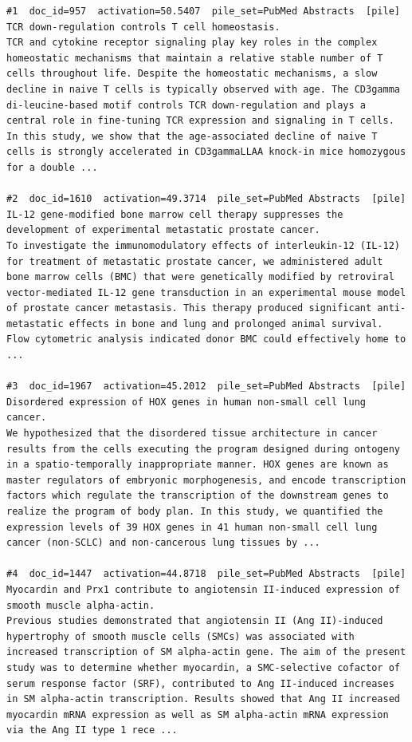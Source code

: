 \begin{verbatim}
#1  doc_id=957  activation=50.5407  pile_set=PubMed Abstracts  [pile]
TCR down-regulation controls T cell homeostasis.
TCR and cytokine receptor signaling play key roles in the complex homeostatic mechanisms that maintain a relative stable number of T cells throughout life. Despite the homeostatic mechanisms, a slow decline in naive T cells is typically observed with age. The CD3gamma di-leucine-based motif controls TCR down-regulation and plays a central role in fine-tuning TCR expression and signaling in T cells. In this study, we show that the age-associated decline of naive T cells is strongly accelerated in CD3gammaLLAA knock-in mice homozygous for a double ...

#2  doc_id=1610  activation=49.3714  pile_set=PubMed Abstracts  [pile]
IL-12 gene-modified bone marrow cell therapy suppresses the development of experimental metastatic prostate cancer.
To investigate the immunomodulatory effects of interleukin-12 (IL-12) for treatment of metastatic prostate cancer, we administered adult bone marrow cells (BMC) that were genetically modified by retroviral vector-mediated IL-12 gene transduction in an experimental mouse model of prostate cancer metastasis. This therapy produced significant anti-metastatic effects in bone and lung and prolonged animal survival. Flow cytometric analysis indicated donor BMC could effectively home to ...

#3  doc_id=1967  activation=45.2012  pile_set=PubMed Abstracts  [pile]
Disordered expression of HOX genes in human non-small cell lung cancer.
We hypothesized that the disordered tissue architecture in cancer results from the cells executing the program designed during ontogeny in a spatio-temporally inappropriate manner. HOX genes are known as master regulators of embryonic morphogenesis, and encode transcription factors which regulate the transcription of the downstream genes to realize the program of body plan. In this study, we quantified the expression levels of 39 HOX genes in 41 human non-small cell lung cancer (non-SCLC) and non-cancerous lung tissues by ...

#4  doc_id=1447  activation=44.8718  pile_set=PubMed Abstracts  [pile]
Myocardin and Prx1 contribute to angiotensin II-induced expression of smooth muscle alpha-actin.
Previous studies demonstrated that angiotensin II (Ang II)-induced hypertrophy of smooth muscle cells (SMCs) was associated with increased transcription of SM alpha-actin gene. The aim of the present study was to determine whether myocardin, a SMC-selective cofactor of serum response factor (SRF), contributed to Ang II-induced increases in SM alpha-actin transcription. Results showed that Ang II increased myocardin mRNA expression as well as SM alpha-actin mRNA expression via the Ang II type 1 rece ...


\end{verbatim}
